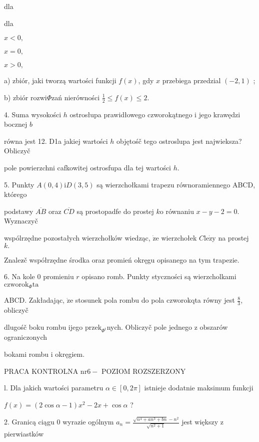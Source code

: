\documentclass[a4paper,12pt]{article}
\begin{document}
dla

dla

$x<0,$

$x=0,$

$x>0,$

a) zbiór, jaki tworzą wartości funkcji $f(x)$, gdy $x$ przebiega przedzial $(-2,1)$ ;

b) zbiór rozwi$\Phi$zań nierówności $\displaystyle \frac{1}{2}\leq f(x)\leq 2.$

4. Suma wysokości $h$ ostrosłupa prawidłowego czworokątnego $\mathrm{i}$ jego krawędzi bocznej $b$

równa jest 12. D1a jakiej wartości $h$ objętośč tego ostroslupa jest najwieksza? Obliczyč

pole powierzchni cafkowitej ostrosfupa dla tej wartości $h.$

5. Punkty $A(0,4) \mathrm{i}D(3,5)$ są wierzchołkami trapezu równoramiennego ABCD, którego

podstawy $\overline{AB}$ oraz $\overline{CD}$ są prostopadfe do prostej $k\mathrm{o}$ równaniu $x-y-2=0$. Wyznaczyč

wspólrzędne pozostałych wierzchołków wiedząc, $\dot{\mathrm{z}}\mathrm{e}$ wierzchołek $C \mathrm{l}\mathrm{e}\dot{\mathrm{z}}\mathrm{y}$ na prostej $k.$

Znalez$\acute{}$č współrzędne środka oraz promień okręgu opisanego na tym trapezie.

6. Na kole $0$ promieniu $r$ opisano romb. Punkty styczności są wierzcholkami $\mathrm{c}\mathrm{z}\mathrm{w}\mathrm{o}\mathrm{r}\mathrm{o}\mathrm{k}_{\Phi}\mathrm{t}\mathrm{a}$

ABCD. Zakładając, $\dot{\mathrm{z}}\mathrm{e}$ stosunek pola rombu do pola czworokqta równy jest $\displaystyle \frac{8}{3}$, obliczyč

dlugośč boku rombu ijego $\mathrm{p}\mathrm{r}\mathrm{z}\mathrm{e}\mathrm{k}_{\Phi^{\mathrm{t}}}$nych. Obliczyč pole jednego $\mathrm{z}$ obszarów ograniczonych

bokami rombu $\mathrm{i}$ okręgiem.





PRACA KONTROLNA $\mathrm{n}\mathrm{r}6-$ POZIOM ROZSZERZONY

l. Dla jakich wartości parametru $\alpha\in[0,2\pi]$ istnieje dodatnie maksimum funkcji

$ f(x)=(2\cos\alpha-1)x^{2}-2x+\cos\alpha$ ?

2. Granicą ciągu $0$ wyrazie ogólnym $a_{n}=\displaystyle \frac{\sqrt{n^{4}+an^{3}+bn}-n^{2}}{\sqrt{n^{2}+1}}$ jest większy $\mathrm{z}$ pierwiastków
\end{document}
